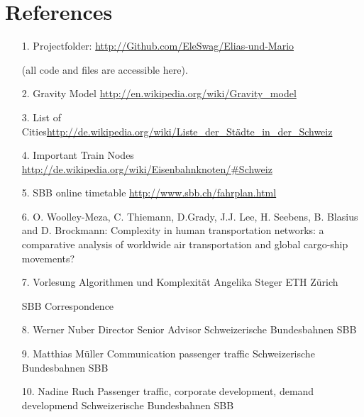 \documentclass[11pt]{article}
\begin{document}
\section{References}
\begin{itemize}
\item[1.] Projectfolder: \url{http://Github.com/EleSwag/Elias-und-Mario} 

(all code and files are accessible here).\newline
\item[2.] Gravity Model \url{http://en.wikipedia.org/wiki/Gravity_model}\newline
\item[3.]List of Cities\url{http://de.wikipedia.org/wiki/Liste_der_Städte_in_der_Schweiz}\newline
\item[4.] Important Train Nodes \url{http://de.wikipedia.org/wiki/Eisenbahnknoten/\#Schweiz}\newline
\item[5.] SBB online timetable \url{http://www.sbb.ch/fahrplan.html}\newline

\item[6.] O. Woolley-Meza, C. Thiemann, D.Grady, J.J. Lee, H. Seebens, B. Blasius and D. Brockmann: Complexity in human transportation networks: a comparative analysis of worldwide air transportation and global cargo-ship movements?\newline
\item[7.] Vorlesung Algorithmen und Komplexität Angelika Steger ETH Z\"urich\newline


SBB Correspondence\newline

\item[8.] Werner Nuber\newline
Director Senior Advisor\newline
Schweizerische Bundesbahnen SBB\newline
\item[9.] Matthias M\"uller\newline
Communication passenger traffic\newline
Schweizerische Bundesbahnen SBB\newline
\item[10.] Nadine Ruch\newline
Passenger traffic, corporate development,
demand developmend \newline
Schweizerische Bundesbahnen SBB\newline


\end{itemize}
\end{document}
